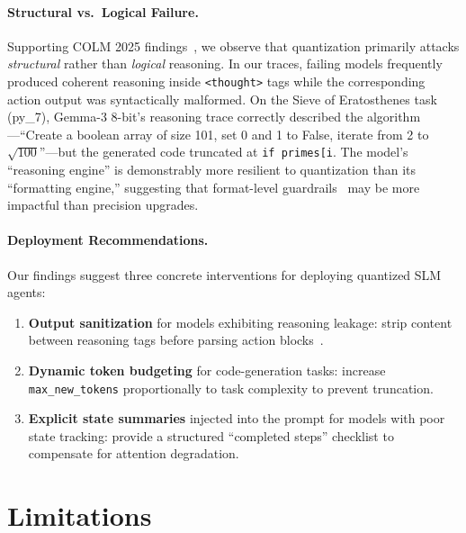 \documentclass{article}
\begin{document}
\paragraph{Structural vs.\ Logical Failure.}
Supporting COLM 2025 findings~\cite{colm2025quantization}, we observe that quantization primarily attacks \emph{structural} rather than \emph{logical} reasoning. In our traces, failing models frequently produced coherent reasoning inside \texttt{<thought>} tags while the corresponding action output was syntactically malformed. On the Sieve of Eratosthenes task (py\_7), Gemma-3 8-bit's reasoning trace correctly described the algorithm---``Create a boolean array of size 101, set 0 and 1 to False, iterate from 2 to $\sqrt{100}$''---but the generated code truncated at \texttt{if primes[i}. The model's ``reasoning engine'' is demonstrably more resilient to quantization than its ``formatting engine,'' suggesting that format-level guardrails~\cite{dong2025acbench} may be more impactful than precision upgrades.

\paragraph{Deployment Recommendations.}
Our findings suggest three concrete interventions for deploying quantized SLM agents:
\begin{enumerate}[nosep]
  \item \textbf{Output sanitization} for models exhibiting reasoning leakage: strip content between reasoning tags before parsing action blocks~\cite{schick2023toolformer}.
  \item \textbf{Dynamic token budgeting} for code-generation tasks: increase \texttt{max\_new\_tokens} proportionally to task complexity to prevent truncation.
  \item \textbf{Explicit state summaries} injected into the prompt for models with poor state tracking: provide a structured ``completed steps'' checklist to compensate for attention degradation.
\end{enumerate}

\section{Limitations}
\label{sec:limitations}
\end{document}
